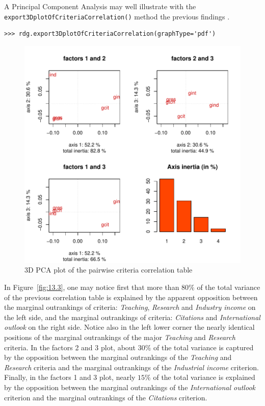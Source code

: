 A Principal Component Analysis may well illustrate with the \texttt{export3Dplot\-OfCriteriaCorrelation()} method the previous findings \citep{CPSTAT-L2}. 
\begin{lstlisting}
>>> rdg.export3DplotOfCriteriaCorrelation(graphType='pdf')
\end{lstlisting}
\begin{figure}[ht]
\includegraphics[width=\hsize]{Figures/13-3-3DCorrelation.pdf}
\caption{3D PCA plot of the pairwise criteria correlation table}
\label{fig:13.3}       %
\end{figure}

In Figure~\vref{fig:13.3}, one may notice first that more than $80\%$ of the total variance of the previous correlation table is explained by the apparent opposition between the marginal outrankings of criteria: \emph{Teaching}, \emph{Research} and \emph{Industry income} on the left side, and the marginal outrankings of criteria: \emph{Citations} and \emph{International outlook} on the right side. Notice also in the left lower corner the nearly identical positions of the marginal outrankings of the major \emph{Teaching} and \emph{Research} criteria. In the factors 2 and 3 plot, about $30\%$ of the total variance is captured by the opposition between the marginal outrankings of the \emph{Teaching} and \emph{Research} criteria and the marginal outrankings of the \emph{Industrial income} criterion. Finally, in the factors 1 and 3 plot, nearly $15\%$ of the total variance is explained by the opposition between the marginal outrankings of the \emph{International outlook} criterion and the marginal outrankings of the \emph{Citations} criterion.

